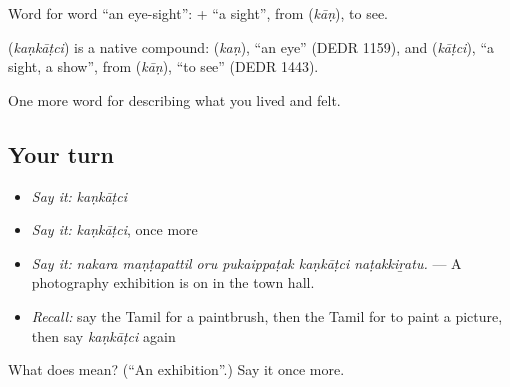 Word for word \textquotedblleft{}an eye-sight\textquotedblright{}:  +  \textquotedblleft{}a sight\textquotedblright{}, from  (\emph{kāṇ}), to see.

\begin{cousinweb}
\textbf{} (\emph{kaṇkāṭci}) is a native compound:  (\emph{kaṇ}), \textquotedblleft{}an eye\textquotedblright{} (DEDR 1159), and  (\emph{kāṭci}), \textquotedblleft{}a sight, a show\textquotedblright{}, from  (\emph{kāṇ}), \textquotedblleft{}to see\textquotedblright{} (DEDR 1443).
\end{cousinweb}

\begin{grammarlens}[title={What you've built}]
One more word for describing what you lived and felt.
\end{grammarlens}

\subsection*{Your turn}
\begin{itemize}
\raggedright
  \item \emph{Say it:} \emph{kaṇkāṭci}
  \item \emph{Say it:} \emph{kaṇkāṭci}, once more
  \item \emph{Say it:} \emph{nakara maṇṭapattil oru pukaippaṭak kaṇkāṭci naṭakkiṟatu.} — A photography exhibition is on in the town hall.
  \item \emph{Recall:} say the Tamil for a paintbrush, then the Tamil for to paint a picture, then say \emph{kaṇkāṭci} again
\end{itemize}

\begin{tcolorbox}[breakable,colback=teal!4,colframe=teal!35!black,title={Before you move on}]
What does  mean? (\textquotedblleft{}An exhibition\textquotedblright{}.) Say it once more.
\end{tcolorbox}
